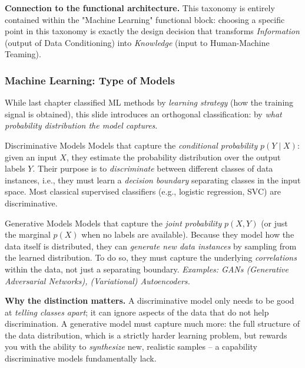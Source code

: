 \textbf{Connection to the functional architecture.} This taxonomy is entirely contained within the "Machine Learning" functional block: choosing a specific point in this taxonomy is exactly the design decision that transforms \emph{Information} (output of Data Conditioning) into \emph{Knowledge} (input to Human-Machine Teaming).

\subsubsection{Machine Learning: Type of Models}

While last chapter classified ML methods by \emph{learning strategy} (how the training signal is obtained), this slide introduces an orthogonal classification: by \emph{what probability distribution the model captures}.

\begin{defbox}{Discriminative Models}
Models that capture the \emph{conditional probability} $p(Y \mid X)$: given an input $X$, they estimate the probability distribution over the output labels $Y$. Their purpose is to \emph{discriminate} between different classes of data instances, i.e., they must learn a \emph{decision boundary} separating classes in the input space. Most classical supervised classifiers (e.g., logistic regression, SVC) are discriminative.
\end{defbox}

\begin{defbox}{Generative Models}
Models that capture the \emph{joint probability} $p(X, Y)$ (or just the marginal $p(X)$ when no labels are available). Because they model how the data itself is distributed, they can \emph{generate new data instances} by sampling from the learned distribution. To do so, they must capture the underlying \emph{correlations} within the data, not just a separating boundary. \emph{Examples: GANs (Generative Adversarial Networks), (Variational) Autoencoders.}
\end{defbox}

\textbf{Why the distinction matters.} A discriminative model only needs to be good at \emph{telling classes apart}; it can ignore aspects of the data that do not help discrimination. A generative model must capture much more: the full structure of the data distribution, which is a strictly harder learning problem, but rewards you with the ability to \emph{synthesize} new, realistic samples -- a capability discriminative models fundamentally lack.

